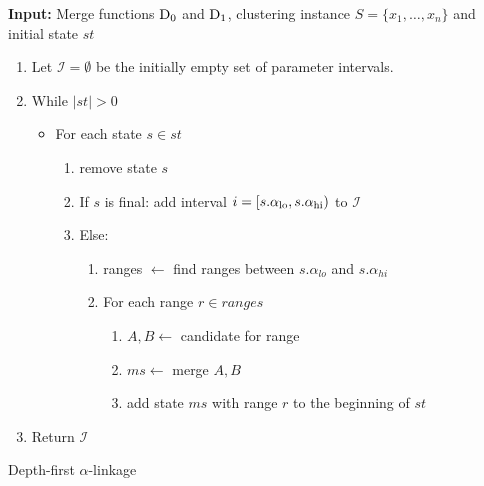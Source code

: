 \begin{algorithm}
    \textbf{Input:} Merge functions $\operatorname{D_{0}}$ and $\operatorname{D_{1}}$, clustering instance $S = \{x_1, \dots, x_n\}$ and initial state $st$
    \begin{enumerate}[nosep, leftmargin=*]
    \item Let $\mathcal{I} = \emptyset$ be the initially empty set of parameter intervals.
    \item While $|st| > 0$
    \begin{itemize}[nosep, leftmargin=*]
        \item For each state $s \in st$
        \begin{enumerate}
            \item remove state $s$\;
            \item If $s$ is final: add interval $i = [s.\alpha_\text{lo}, s.\alpha_\text{hi})$ to $\mathcal{I}$
            \item Else: 
            \begin{enumerate}
                \item ranges $\gets$ find ranges between $s.\alpha_{lo}$ and $s.\alpha_{hi}$
                \item For each range $r \in ranges$
                \begin{enumerate}
                    \item $A, B \gets$ candidate for range
                    \item $ms \gets$ merge $A, B$
                    \item add state $ms$ with range $r$ to the beginning of $st$
                \end{enumerate}
            \end{enumerate}
        \end{enumerate}
    \end{itemize}
    \item Return $\mathcal{I}$
    \end{enumerate}
    \caption{Depth-first $\alpha$-linkage}
    \label{alg:alphalinkage3}
\end{algorithm}

